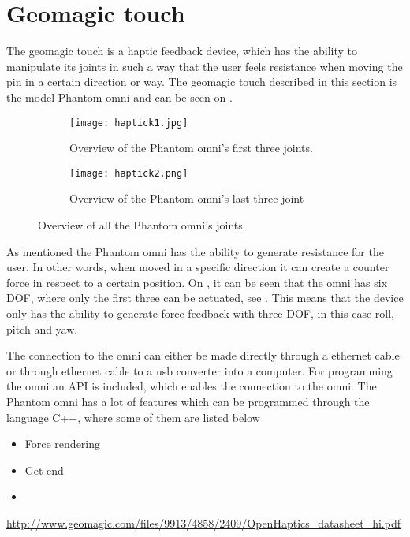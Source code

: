 \section{Geomagic touch}\label{sec:geo_magic}
The geomagic touch is a haptic feedback device, which has the ability to manipulate its joints in such a way that the user feels resistance when moving the pin in a certain direction or way. The geomagic touch described in this section is the model Phantom omni and can be seen on .

\begin{figure}[H]
	\centering
	\begin{subfigure}{.45\textwidth}
		\centering
		\texttt{[image: haptick1.jpg]}
		\caption{Overview of the Phantom omni's first three joints.}
		\label{fig:phantom1}
	\end{subfigure}
	\begin{subfigure}{.45\textwidth}
		\centering
		\texttt{[image: haptick2.png]}
		\caption{Overview of the Phantom omni's last three joint}
		\label{fig:phantom2}
	\end{subfigure}
\caption{Overview of all the Phantom omni's joints\cite{phantom_omni}}
\label{fig:phantom_omni}
\end{figure}

As mentioned the Phantom omni has the ability to generate resistance for the user. In other words, when moved in a specific direction it can create a counter force in respect to a certain position. On , it can be seen that the omni has six \gls{DOF}, where only the first three can be actuated, see . This means that the device only has the ability to generate force feedback with three \gls{DOF}, in this case roll, pitch and yaw.

The connection to the omni can either be made directly through a ethernet cable or through ethernet cable to a usb converter into a computer. For programming the omni an API is included, which enables the connection to the omni. The Phantom omni has a lot of features which can be programmed through the language C++, where some of them are listed below
\begin{itemize} 
\item Force rendering 
\item Get end 
\item 
\end{itemize} 

\url{http://www.geomagic.com/files/9913/4858/2409/OpenHaptics_datasheet_hi.pdf}

